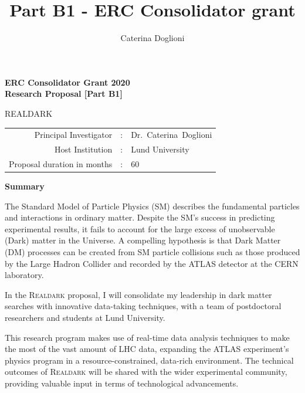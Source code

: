 \documentclass[11pt,a4paper]{article}
\title{{\Large Part B1 - ERC Consolidator grant}}
\author{{\normalsize Caterina Doglioni}}
\date{}                                           %
\begin{document}
\begin{center} 

{\Large\bf ERC Consolidator Grant 2020} \\
	{\Large\bf Research Proposal [Part B1]}  \\
 
\vspace{2cm} 
{\huge {\bf }}   \smallskip  

\vspace{2cm} 
{\Huge{REALDARK}} \\ 
\vspace{1cm} 
\vspace{1cm}
\end{center} 
\begin{tabular}{rcl}
Principal Investigator & : & Dr.~Caterina~Doglioni \\
Host Institution & : & Lund University \\ 
Proposal duration in months & : & 60 \\
\end{tabular}  
\vspace{2cm}


\begin{center} {\bf Summary}  \end{center}

The Standard Model of Particle Physics (SM) describes the fundamental particles and interactions in ordinary matter. Despite the SM's success in predicting experimental results, it fails to account for the large excess of unobservable (Dark) matter in the Universe. A compelling hypothesis is that Dark Matter (DM) processes can be created from SM particle collisions such as those produced by the Large Hadron Collider and recorded by the ATLAS detector at the CERN laboratory. 

In the \textsc{Realdark} proposal, I will consolidate my leadership in dark matter searches with innovative data-taking techniques, with a team of postdoctoral researchers and students at Lund University. 

This research program makes use of real-time data analysis techniques to make the most of the vast amount of LHC data, expanding the ATLAS experiment’s physics program in a resource-constrained, data-rich environment. The technical outcomes of \textsc{Realdark} will be shared with the wider experimental community, providing valuable input in terms of  technological advancements. 
\end{document}
